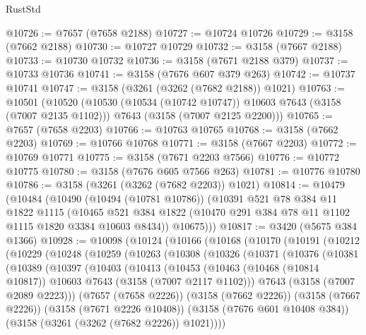 \begin{lexlean}{RustStd}
\begin{coremodule}
{\begin{coremodule}
{{{{{{{{{{{{{{{{{{{{{{{{{{@10726 := @7657 (@7658 @2188)
@10727 := @10724 @10726
@10729 := @3158 (@7662 @2188)
@10730 := @10727 @10729
@10732 := @3158 (@7667 @2188)
@10733 := @10730 @10732
@10736 := @3158 (@7671 @2188 @379)
@10737 := @10733 @10736
@10741 := @3158 (@7676 @607 @379 @263)
@10742 := @10737 @10741
@10747 := @3158 (@3261 (@3262 (@7682 @2188)) @1021)
@10763 := @10501
    (@10520
      (@10530 (@10534 (@10742 @10747)) @10603 @7643 (@3158 (@7007 @2135 @1102)))
      @7643
      (@3158 (@7007 @2125 @2200)))
@10765 := @7657 (@7658 @2203)
@10766 := @10763 @10765
@10768 := @3158 (@7662 @2203)
@10769 := @10766 @10768
@10771 := @3158 (@7667 @2203)
@10772 := @10769 @10771
@10775 := @3158 (@7671 @2203 @7566)
@10776 := @10772 @10775
@10780 := @3158 (@7676 @605 @7566 @263)
@10781 := @10776 @10780
@10786 := @3158 (@3261 (@3262 (@7682 @2203)) @1021)
@10814 := @10479
    (@10484
      (@10490
        (@10494 (@10781 @10786))
        (@10391
          @521
          @78
          @384
          @11
          @1822
          @1115
          (@10465 @521 @384 @1822 (@10470 @291 @384 @78 @11 @1102 @1115 @1820 @3384 @10603 @8434))
          @10675)))
@10817 := @3420 (@5675 @384 @1366)
@10928 := @10098
    (@10124
      (@10166
        (@10168
          (@10170
            (@10191
              (@10212
                (@10229
                  (@10248
                    (@10259
                      (@10263
                        (@10308
                          (@10326
                            (@10371
                              (@10376
                                (@10381
                                  (@10389
                                    (@10397
                                      (@10403
                                        (@10413
                                          (@10453
                                            (@10463
                                              (@10468 (@10814 @10817))
                                              @10603
                                              @7643
                                              (@3158 (@7007 @2117 @1102)))
                                            @7643
                                            (@3158 (@7007 @2089 @2223)))
                                          (@7657 (@7658 @2226))
                                          (@3158 (@7662 @2226))
                                          (@3158 (@7667 @2226))
                                          (@3158 (@7671 @2226 @10408))
                                          (@3158 (@7676 @601 @10408 @384))
                                          (@3158 (@3261 (@3262 (@7682 @2226)) @1021))))
}}}}}}}}}}}}}}}}}}}}}}}}}}
\end{coremodule}}
\end{coremodule}
\end{lexlean}
